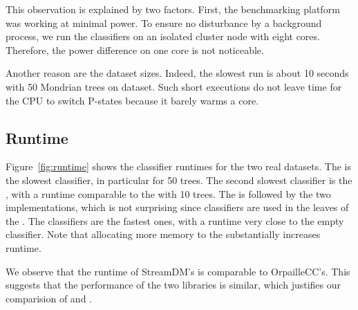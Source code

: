 This observation is explained by two factors. First, the benchmarking
platform was  working at minimal power. To ensure no disturbance by a
background process, we run the classifiers on an isolated cluster node with
eight cores. Therefore, the power difference on one core is not noticeable.

Another reason are the dataset sizes. Indeed, the slowest run is about
10 seconds with 50 Mondrian trees on \recofitdataset dataset. Such short
executions do not leave time for the CPU to switch P-states because it
barely warms a core.


\subsection{Runtime}

Figure~\ref{fig:runtime} shows the classifier runtimes for the two real
datasets. The \mondrianforest is the slowest classifier, in particular for 50
trees. The second slowest classifier is the \hoeffdingtree, with a runtime
comparable to the \mondrianforest with 10 trees. The \hoeffdingtree is followed
by the two \naivebayes implementations, which is not surprising since
\naivebayes classifiers are used in the leaves of the \hoeffdingtree. The \mcnn
classifiers are the fastest ones, with a runtime very close to the empty
classifier. Note that allocating more memory to the \mondrianforest
substantially increases runtime.

We observe that the runtime of StreamDM's \naivebayes is comparable to
OrpailleCC's. This suggests that the performance of the two libraries is
similar, which justifies our comparision of \hoeffdingtree and \mondrianforest.

